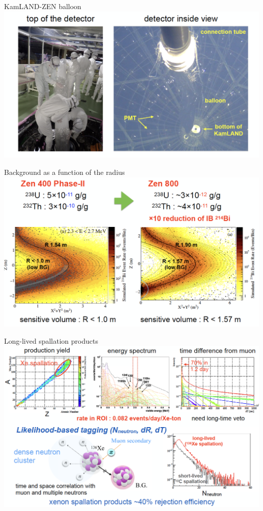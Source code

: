 \documentclass [aspectratio=169]{beamer}
\begin{document}
\begin{frame}{KamLAND-ZEN balloon}
\includegraphics[scale=0.30]{baloon.png}
\end{frame}

\begin{frame}{Background as a function of the radius}
\includegraphics[scale=0.30]{bkgradius.png}
\end{frame}

\begin{frame}{Long-lived spallation products}
\includegraphics[scale=0.30]{spalallation.png}
\end{frame}
\end{document}
